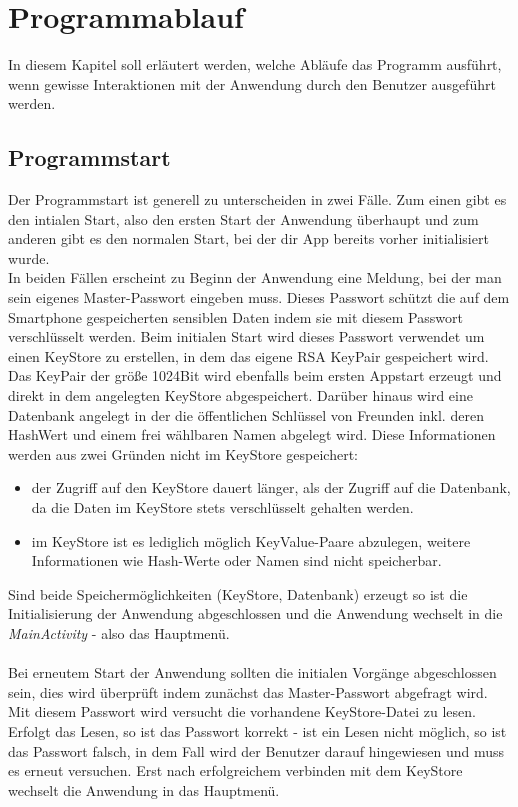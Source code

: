 \documentclass[10pt, a4paper,headsepline]{scrreprt}
\begin{document}
\section{Programmablauf}
In diesem Kapitel soll erläutert werden, welche Abläufe das Programm ausführt, wenn gewisse Interaktionen mit der Anwendung durch den Benutzer ausgeführt werden. 


\subsection{Programmstart}
Der Programmstart ist generell zu unterscheiden in zwei Fälle. Zum einen gibt es den intialen Start, also den ersten Start der Anwendung überhaupt und  zum anderen gibt es den normalen Start, bei der dir App bereits vorher initialisiert wurde. \\
In beiden Fällen erscheint zu Beginn der Anwendung eine Meldung, bei der man sein eigenes Master-Passwort eingeben muss. Dieses Passwort schützt die auf dem Smartphone gespeicherten sensiblen Daten indem sie mit diesem Passwort verschlüsselt werden. Beim initialen Start wird dieses Passwort verwendet um einen KeyStore zu erstellen, in dem das eigene RSA KeyPair gespeichert wird. Das KeyPair der größe 1024Bit wird ebenfalls beim ersten Appstart erzeugt und direkt in dem angelegten KeyStore abgespeichert. Darüber hinaus wird eine Datenbank angelegt in der die öffentlichen Schlüssel von Freunden inkl. deren HashWert und einem frei wählbaren Namen abgelegt wird. Diese Informationen werden aus zwei Gründen nicht im KeyStore gespeichert:
\begin{itemize}
\item der Zugriff auf den KeyStore dauert länger, als der Zugriff auf die Datenbank, da die Daten im KeyStore stets verschlüsselt gehalten werden.
\item im KeyStore ist es lediglich möglich KeyValue-Paare abzulegen, weitere Informationen wie Hash-Werte oder Namen sind nicht speicherbar.
\end{itemize}
Sind beide Speichermöglichkeiten (KeyStore, Datenbank) erzeugt so ist die Initialisierung der Anwendung abgeschlossen und die Anwendung wechselt in die \textit{MainActivity} - also das Hauptmenü.\\ \\
Bei erneutem Start der Anwendung sollten die initialen Vorgänge abgeschlossen sein, dies wird überprüft indem zunächst das Master-Passwort abgefragt wird. Mit diesem Passwort wird versucht die vorhandene KeyStore-Datei zu lesen. Erfolgt das Lesen, so ist das Passwort korrekt - ist ein Lesen nicht möglich, so ist das Passwort falsch, in dem Fall wird der Benutzer darauf hingewiesen und muss es erneut versuchen. Erst nach erfolgreichem verbinden mit dem KeyStore wechselt die Anwendung in das Hauptmenü.
\end{document}
